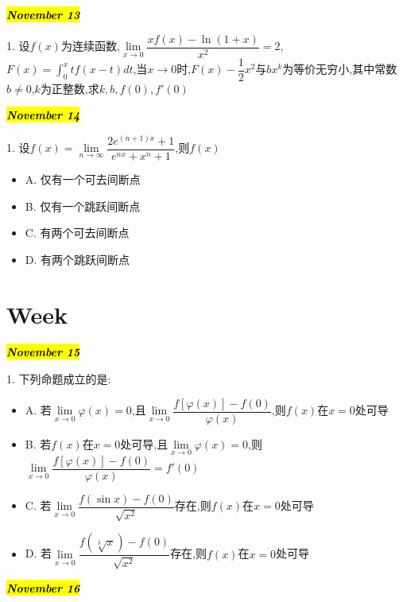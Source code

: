 \hl{\textbf{\textit{November 13}}}

1. 设$f(x)$为连续函数,$\lim\limits_{x\rightarrow 0}\dfrac{xf(x)-\ln(1+x)}{x^{2}}=2$,$F(x)=\int_{0}^{x}tf(x-t)dt$,当$x\to 0$时,$F(x)-\dfrac{1}{2}x^{2}$与$bx^{k}$为等价无穷小,其中常数$b\neq 0$,$k$为正整数,求$k,b,f(0),f'(0)$
\begin{solution}
	
\end{solution}

\hl{\textbf{\textit{November 14}}}

1. 设$f(x)=\lim\limits_{n\rightarrow\infty}\dfrac{2e^{(n+1)x}+1}{e^{nx}+x^{n}+1}$,则$f(x)$
\begin{itemize}
	\item A. 仅有一个可去间断点 
	\item B. 仅有一个跳跃间断点
	\item C. 有两个可去间断点
	\item D. 有两个跳跃间断点
\end{itemize}
\begin{solution}
	
\end{solution}

\section{Week }
\hl{\textbf{\textit{November 15}}}

1. 下列命题成立的是:
\begin{itemize}
	\item A. 若$\lim\limits_{x\rightarrow 0}\varphi(x)=0$,且$\lim\limits_{x\rightarrow 0}\dfrac{f\left[\varphi(x)\right]-f(0)}{\varphi(x)}$,则$f(x)$在$x=0$处可导
	\item B. 若$f(x)$在$x=0$处可导,且$\lim\limits_{x\rightarrow 0}\varphi(x)=0$,则$\lim\limits_{x\rightarrow 0}\dfrac{f\left[\varphi(x)\right]-f(0)}{\varphi(x)}=f'(0)$
	\item C. 若$\lim\limits_{x\rightarrow 0}\dfrac{f(\sin x)-f(0)}{\sqrt{x^{2}}}$存在,则$f(x)$在$x=0$处可导
	\item D. 若$\lim\limits_{x\rightarrow 0}\dfrac{f(\sqrt[3]{x})-f(0)}{\sqrt{x^{2}}}$存在,则$f(x)$在$x=0$处可导
\end{itemize}
\begin{solution}
	
\end{solution}

\hl{\textbf{\textit{November 16}}}

